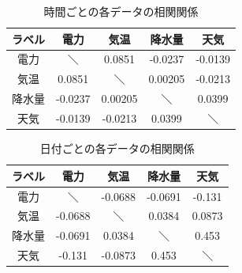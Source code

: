 \begin{table}[!t]
\centering
  \caption{時間ごとの各データの相関関係}
  \begin{tabular}{|c|c|c|c|c|} \hline
    ラベル & 電力 & 気温 & 降水量 & 天気 \\ \hline
    電力 & ＼ & 0.0851 & -0.0237 & -0.0139 \\ \hline
    気温 & 0.0851 & ＼ & 0.00205 & -0.0213 \\ \hline
    降水量 & -0.0237 & 0.00205 & ＼ & 0.0399 \\ \hline
    天気 & -0.0139 & -0.0213 & 0.0399 & ＼ \\ \hline
  \end{tabular}
\end{table}

\begin{table}[!t]
\centering
  \caption{日付ごとの各データの相関関係}
  \begin{tabular}{|c|c|c|c|c|} \hline
    ラベル & 電力 & 気温 & 降水量 & 天気 \\ \hline
    電力 & ＼ & -0.0688 & -0.0691 & -0.131 \\ \hline
    気温 & -0.0688 & ＼ & 0.0384 & 0.0873 \\ \hline
    降水量 & -0.0691 & 0.0384 & ＼ & 0.453 \\ \hline
    天気 & -0.131 & -0.0873 & 0.453 & ＼ \\ \hline
  \end{tabular}
\end{table}

